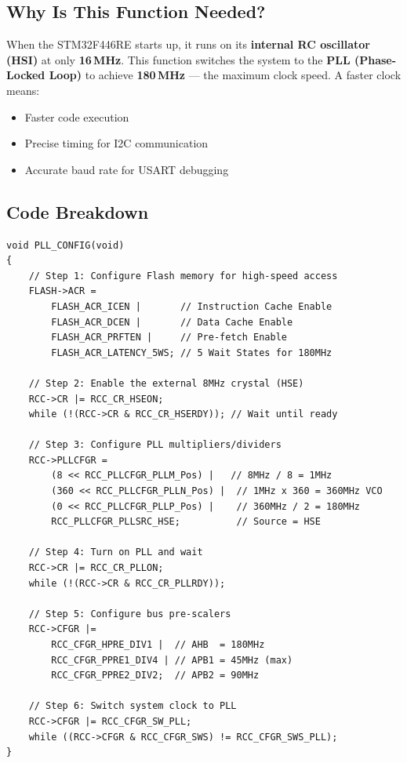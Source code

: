 \documentclass[12pt, a4paper]{article}
\begin{document}
\subsection{Why Is This Function Needed?}

When the STM32F446RE starts up, it runs on its \textbf{internal RC oscillator (HSI)} at only \textbf{16\,MHz}. This function switches the system to the \textbf{PLL (Phase-Locked Loop)} to achieve \textbf{180\,MHz} --- the maximum clock speed. A faster clock means:

\begin{itemize}[leftmargin=2em]
    \item Faster code execution
    \item Precise timing for I2C communication
    \item Accurate baud rate for USART debugging
\end{itemize}

\subsection{Code Breakdown}

\begin{codebox}
\begin{lstlisting}[style=CStyle]
void PLL_CONFIG(void)
{
    // Step 1: Configure Flash memory for high-speed access
    FLASH->ACR =
        FLASH_ACR_ICEN |       // Instruction Cache Enable
        FLASH_ACR_DCEN |       // Data Cache Enable
        FLASH_ACR_PRFTEN |     // Pre-fetch Enable
        FLASH_ACR_LATENCY_5WS; // 5 Wait States for 180MHz

    // Step 2: Enable the external 8MHz crystal (HSE)
    RCC->CR |= RCC_CR_HSEON;
    while (!(RCC->CR & RCC_CR_HSERDY)); // Wait until ready

    // Step 3: Configure PLL multipliers/dividers
    RCC->PLLCFGR =
        (8 << RCC_PLLCFGR_PLLM_Pos) |   // 8MHz / 8 = 1MHz
        (360 << RCC_PLLCFGR_PLLN_Pos) |  // 1MHz x 360 = 360MHz VCO
        (0 << RCC_PLLCFGR_PLLP_Pos) |    // 360MHz / 2 = 180MHz
        RCC_PLLCFGR_PLLSRC_HSE;          // Source = HSE

    // Step 4: Turn on PLL and wait
    RCC->CR |= RCC_CR_PLLON;
    while (!(RCC->CR & RCC_CR_PLLRDY));

    // Step 5: Configure bus pre-scalers
    RCC->CFGR |=
        RCC_CFGR_HPRE_DIV1 |  // AHB  = 180MHz
        RCC_CFGR_PPRE1_DIV4 | // APB1 = 45MHz (max)
        RCC_CFGR_PPRE2_DIV2;  // APB2 = 90MHz

    // Step 6: Switch system clock to PLL
    RCC->CFGR |= RCC_CFGR_SW_PLL;
    while ((RCC->CFGR & RCC_CFGR_SWS) != RCC_CFGR_SWS_PLL);
}
\end{lstlisting}
\end{codebox}
\end{document}
